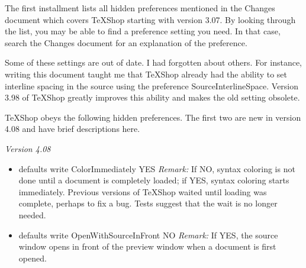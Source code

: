 \documentclass[11pt, oneside]{article}   	%
\begin{document}
The first installment lists all hidden preferences mentioned in the Changes document which covers TeXShop starting with version 3.07. By looking through the list, you may be able to find a preference setting you need. In that case, search the Changes document for an explanation of the preference. 

Some of these settings are out of date. I had forgotten about others. For instance, writing this document taught me that TeXShop already had the ability to set interline spacing in the source using the preference SourceInterlineSpace. Version 3.98 of TeXShop greatly improves this ability and makes the old setting obsolete.




TeXShop obeys the following hidden preferences. The first two are new in version 4.08 and have brief descriptions here.

{\em Version 4.08}
\begin{itemize}
\item defaults write ColorImmediately YES \newline \newline
{\em Remark:} If NO, syntax coloring is not done until a document is completely loaded; if YES, syntax coloring starts immediately. Previous versions of TeXShop waited until loading was complete, perhaps to fix a bug. Tests suggest that the wait is no longer needed. \newline
\item defaults write OpenWithSourceInFront NO \newline \newline
{\em Remark:}  If YES, the source window opens in front of the preview window when a document is first opened. \newline
\end{itemize}
\end{document}
